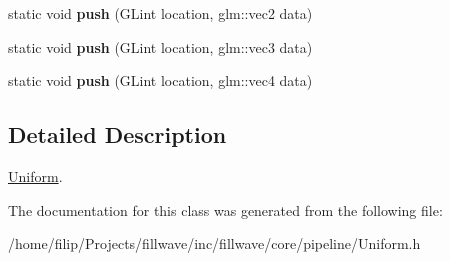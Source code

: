 \begin{DoxyCompactItemize}
\item 
\hypertarget{classfillwave_1_1core_1_1Uniform_a027689d9f388f4c40844b61a0458ac14}{}static void {\bfseries push} (G\+Lint location, glm\+::vec2 data)\label{classfillwave_1_1core_1_1Uniform_a027689d9f388f4c40844b61a0458ac14}

\item 
\hypertarget{classfillwave_1_1core_1_1Uniform_abfdedcaa45a8040e190f1adbc0fa21f3}{}static void {\bfseries push} (G\+Lint location, glm\+::vec3 data)\label{classfillwave_1_1core_1_1Uniform_abfdedcaa45a8040e190f1adbc0fa21f3}

\item 
\hypertarget{classfillwave_1_1core_1_1Uniform_a3fc302148c331073236115aa4c6fd1d9}{}static void {\bfseries push} (G\+Lint location, glm\+::vec4 data)\label{classfillwave_1_1core_1_1Uniform_a3fc302148c331073236115aa4c6fd1d9}

\end{DoxyCompactItemize}


\subsection{Detailed Description}
\hyperlink{classfillwave_1_1core_1_1Uniform}{Uniform}. 

The documentation for this class was generated from the following file\+:\begin{DoxyCompactItemize}
\item 
/home/filip/\+Projects/fillwave/inc/fillwave/core/pipeline/Uniform.\+h\end{DoxyCompactItemize}
